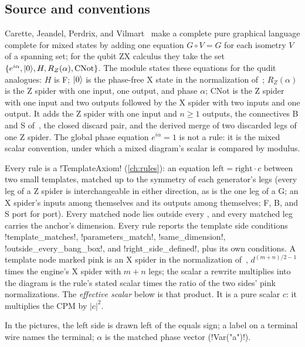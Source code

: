 \subsection{Source and conventions}

Carette, Jeandel, Perdrix, and Vilmart~\cite{carette2019mixed} make a complete pure graphical language complete for mixed states by adding one equation $G\circ V=G$ for each isometry $V$ of a spanning set; for the qubit ZX calculus they take the set $\{e^{i\alpha}, \lvert 0 \rangle, H, R_Z(\alpha), \mathrm{CNot}\}$. The module  states these equations for the qudit analogues: $H$ is F; $\lvert 0 \rangle$ is the phase-free X state in the normalization of~\cite{poor2023zxw}; $R_Z(\alpha)$ is the Z spider with one input, one output, and phase $\alpha$; CNot is the Z spider with one input and two outputs followed by the X spider with two inputs and one output. It adds the Z spider with one input and $n\ge 1$ outputs, the connectives B and S of~\cite{wang2023qufinitezxw}, the closed discard pair, and the derived merge of two discarded legs of one Z spider. The global phase equation $e^{i\alpha}=1$ is not a rule: it is the mixed scalar convention, under which a mixed diagram's scalar is compared by modulus.

Every rule is a \py!TemplateAxiom! (\cref{ch:rules}): an equation $\mathrm{left}=\mathrm{right}\cdot c$ between two small templates, matched up to the symmetry of each generator's legs (every leg of a Z spider is interchangeable in either direction, as is the one leg of a G; an X spider's inputs among themselves and its outputs among themselves; F, B, and S port for port). Every matched node lies outside every \bbox{}, and every matched leg carries the anchor's dimension. Every rule reports the template side conditions \code!template_matches!, \code!parameters_match!, \code!same_dimension!, \code!outside_every_bang_box!, and \code!right_side_defined!, plus its own conditions. A template node marked pink is an X spider in the normalization of~\cite{poor2023zxw}, $d^{(m+n)/2-1}$ times the engine's X spider with $m+n$ legs; the scalar a rewrite multiplies into the diagram is the rule's stated scalar times the ratio of the two sides' pink normalizations. The \emph{effective scalar} below is that product. It is a pure scalar $c$: it multiplies the CPM by $|c|^2$.

In the pictures, the left side is drawn left of the equals sign; a label on a terminal wire names the terminal; $\alpha$ is the matched phase vector (\py!Var("a")!).

